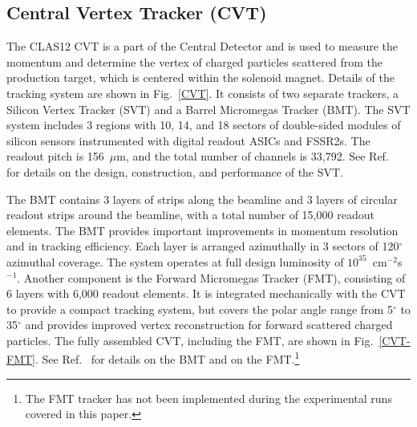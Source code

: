 \documentclass[final,3p,twocolumn]{elsarticle}
\begin{document}
\subsection{Central Vertex Tracker (CVT)}

The CLAS12 CVT is a part of the Central Detector and is used to measure the momentum and determine the vertex
of charged particles scattered from the production target, which is centered within the solenoid magnet. Details of
the tracking system are shown in Fig.~\ref{CVT}. It consists of two separate trackers, a Silicon Vertex Tracker
(SVT) and a Barrel Micromegas Tracker  (BMT). The SVT system includes 3 regions with 10, 14, and 18 sectors of
double-sided modules of silicon sensors instrumented with digital readout ASICs and FSSR2s. The readout pitch is
156~$\mu$m, and the total number of channels is 33,792. See Ref.~\cite{SVT} for details on the design,
construction, and performance of the SVT.

The BMT contains 3 layers of strips along the beamline and 3 layers of circular readout strips around the beamline,
with a total number of 15,000 readout elements. The BMT provides important improvements in momentum resolution
and in tracking efficiency. Each layer is arranged azimuthally in 3 sectors of 120$^\circ$ azimuthal coverage. The
system operates at full design luminosity of $10^{35}$~cm$^{-2}$s$^{-1}$. Another component is the Forward
Micromegas Tracker (FMT), consisting of 6 layers with 6,000 readout elements. It  is integrated mechanically with
the CVT to provide a compact tracking system, but covers the polar angle range from 5$^\circ$ to 35$^\circ$ and
provides improved vertex reconstruction for forward scattered charged particles. The fully assembled CVT,
including the FMT, are shown in Fig.~\ref{CVT-FMT}.  See Ref.~\cite{BMT} for details on the BMT and on the
FMT.\footnote{The FMT tracker has not been implemented during the experimental runs covered in this paper.}  
\end{document}

